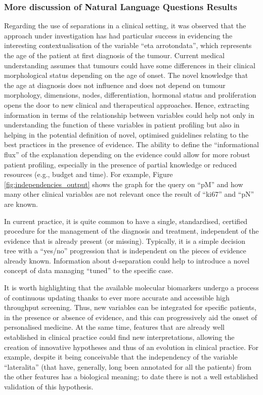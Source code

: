 \subsubsection{More discussion of Natural Language Questions Results}
Regarding the use of separations in a clinical setting, it was observed that the approach under investigation has had particular success in evidencing the interesting contextualisation of the variable \enquote{eta arrotondata}, which represents the age of the patient at first diagnosis of the tumour. 
Current medical understanding assumes that tumours could have some differences in their clinical morphological status depending on the age of onset. 
The novel knowledge that the age at diagnosis does not influence and does not depend on tumour morphology, dimensions, nodes, differentiation, hormonal status and proliferation opens the door to new clinical and therapeutical approaches. 
Hence, extracting information in terms of the relationship between variables could help not only in understanding the function of these variables in patient profiling but also in helping in the potential definition of novel, optimised guidelines relating to the best practices in the presence of evidence. 
The ability to define the \enquote{informational flux} of the explanation depending on the evidence could allow for more robust patient profiling, especially in the presence of partial knowledge or reduced resources (e.g., budget and time).
For example, Figure \ref{fig:independencies_output} shows the graph for the query on \enquote{pM} and how many other clinical variables are not relevant once the result of \enquote{ki67} and \enquote{pN} are known.

In current practice, it is quite common to have a single, standardised, certified procedure for the management of the diagnosis and treatment, independent of the evidence that is already present (or missing). 
Typically, it is a simple decision tree with a \enquote{yes/no} progression that is independent on the pieces of evidence already known. 
Information about d-separation could help to introduce a novel concept of data managing \enquote{tuned} to the specific case.

It is worth highlighting that the available molecular biomarkers undergo a process of continuous updating thanks to ever more accurate and accessible high throughput screening. 
Thus, new variables can be integrated for specific patients, in the presence or absence of evidence, and this can progressively aid the onset of personalised medicine. 
At the same time, features that are already well established in clinical practice could find new interpretations, allowing the creation of innovative hypotheses and thus of an evolution in clinical practice. 
For example, despite it being conceivable that the independency of the variable \enquote{lateralita} (that have, generally, long been annotated for all the patients) from the other features has a biological meaning; to date there is not a well established validation of this hypothesis. 

